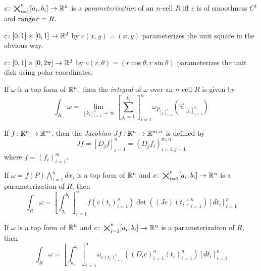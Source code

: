 \documentclass[notes]{subfiles}
\begin{document}
\begin{definition}
    $c\colon \bigtimes_{i = 1}^n [a_i, b_i] \to \mathbb{R}^n$ is a \textit{parameterization} of an $n$-cell $R$ iff $c$ is of smoothness $C^1$ and $\operatorname{range} c = R$.
\end{definition}

\begin{example}
    $c\colon [0, 1] \times [0, 1] \to \mathbb{R}^2$ by $c(x, y) = (x, y)$ parameterizes the unit square in the obvious way.
\end{example}

\begin{example}
    $c\colon [0, 1] \times [0, 2\pi] \to \mathbb{R}^2$ by $c(r, \theta) = (r\cos\theta, r\sin\theta)$ parameterizes the unit disk using polar coordinates.
\end{example}

\begin{definition}
    If $\omega$ is a top form of $\mathbb{R}^n$, then the \textit{integral} of $\omega$ over an $n$-cell $R$ is given by
    \[
        \int_R \omega = \lim_{[k_i]_{i = 1}^n \to \infty} \left[ \sum_{j_i = 1}^{k_i} \right]_{i = 1}^n \omega_{P_{[j_i]_{i = 1}^n}}(\vec{v}_{[j_i]_{i = 1}^n})
    \]
\end{definition}

\begin{definition}[Jacobian]
    If $f\colon \mathbb{R}^n \to \mathbb{R}^m$, then the \textit{Jacobian} $Jf\colon \mathbb{R}^n \to \mathbb{R}^{m, n}$ is defined by
    \[
        Jf = [ D_j f ]_{j = 1}^n = ( D_j f_i )_{i = 1, j = 1}^{m, n}
    \]
    where $f = (f_i)_{i = 1}^m$.
\end{definition}

\begin{theorem}
    If $\omega = f(P)\bigwedge_{i = 1}^n dx_i$ is a top form of $\mathbb{R}^n$ and $c\colon \bigtimes_{i = 1}^n [a_i, b_i] \to \mathbb{R}^n$ is a parameterization of $R$, then
    \[
        \int_R \omega = \left[ \int_{a_i}^{b_i} \right]_{i = 1}^n f(c(t_i)_{i = 1}^n) \det((Jc)(t_i)_{i = 1}^n) [dt_i]_{i = 1}^n
    \]
\end{theorem}

\begin{theorem}
    If $\omega$ is a top form of $\mathbb{R}^n$ and $c\colon \bigtimes_{i = 1}^n [a_i, b_i] \to \mathbb{R}^n$ is a parameterization of $R$, then
    \[
        \int_R \omega = \left[ \int_{a_i}^{b_i} \right]_{i = 1}^n \omega_{c(t_i)_{i = 1}^n}((D_i c)_{i = 1}^n(t_i)_{i = 1}^n) [dt_i]_{i = 1}^n
    \]
\end{theorem}
\end{document}
